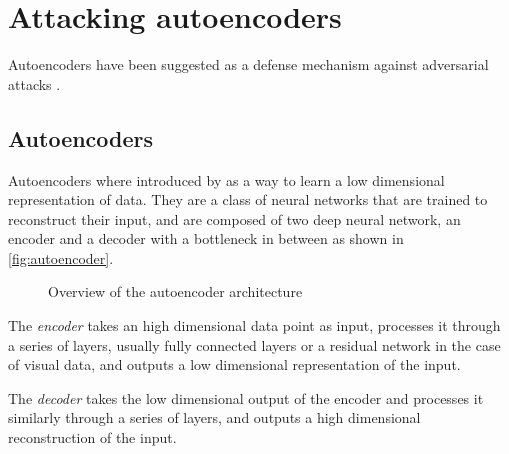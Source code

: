 \documentclass[]{scrarticle}
\begin{document}
\newpage

\section{Attacking autoencoders}

Autoencoders have been suggested as a defense mechanism against adversarial attacks
\cite{guo2017countering,liu2017enhanced,liu2018feature}.

\subsection{Autoencoders}

Autoencoders where introduced by \cite{hinton2006reducing} as a way to learn
a low dimensional representation of data.
They are a class of neural networks that are trained to reconstruct their input,
and are composed of two deep neural network, an encoder and a decoder with a bottleneck in between
as shown in \autoref{fig:autoencoder}.

\begin{figure}[h]
  \centering
  \caption{Overview of the autoencoder architecture}
  \label{fig:autoencoder}
\end{figure}

The \emph{encoder} takes an high dimensional data point as input,
processes it through a series of layers, usually fully connected layers
or a residual network \cite{He2015DeepRL} in the case of visual data,
and outputs a low dimensional representation of the input.

The \emph{decoder} takes the low dimensional output of the encoder and
processes it similarly through a series of layers,
and outputs a high dimensional reconstruction of the input.
\end{document}

